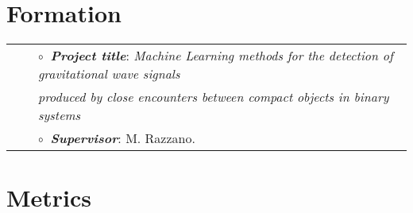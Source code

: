 
\section{Formation}

\vspace{-0.1cm}
\begin{tabular}{rcl}
&\hspace{0.4cm} &$\circ\;\;${\textbf{\textit{Project title}}}: \textit{Machine Learning methods for the detection of gravitational wave signals}\\&\hspace{0.4cm} &
\textit{\phantom{Project title    }produced by close encounters between compact objects in binary systems}\\
&\hspace{0.4cm} &$\circ\;\;${\textbf{\textit{Supervisor}}}:  M. Razzano.\\
\end{tabular}
\vspace{0.2cm}


\section{Metrics}



%

\vspace{0.2cm}



%



\vspace{0.2cm}





